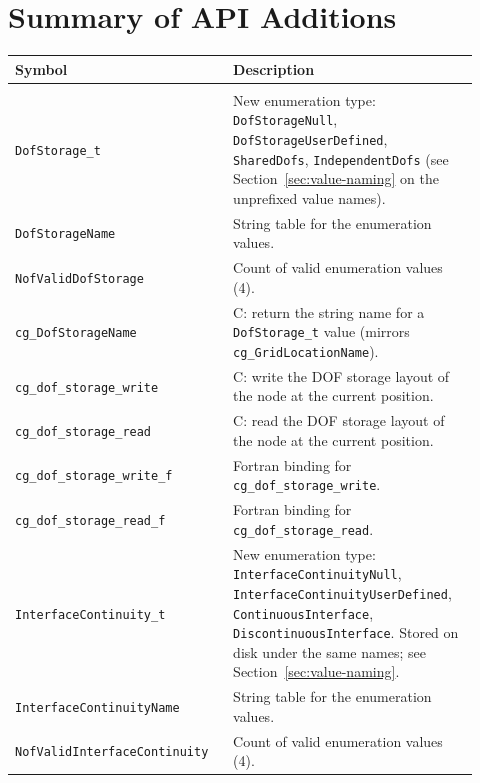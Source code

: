 \documentclass[11pt,letterpaper]{article}
\begin{document}
\section{Summary of API Additions}

\begin{center}
\begin{longtable}{>{\raggedright\arraybackslash}p{0.42\linewidth} >{\raggedright\arraybackslash}p{0.50\linewidth}}
\toprule
\textbf{Symbol} & \textbf{Description} \\
\midrule
\endhead
\multicolumn{2}{@{}l}{\textit{Public (\texttt{cgnslib.h})}} \\
\texttt{DofStorage\_t} & New enumeration type: \texttt{DofStorageNull}, \texttt{DofStorageUserDefined}, \texttt{SharedDofs}, \texttt{IndependentDofs} (see Section~\ref{sec:value-naming} on the unprefixed value names). \\
\texttt{DofStorageName} & String table for the enumeration values. \\
\texttt{NofValidDofStorage} & Count of valid enumeration values (4). \\
\texttt{cg\_DofStorageName} & C: return the string name for a \texttt{DofStorage\_t} value (mirrors \texttt{cg\_GridLocationName}). \\
\texttt{cg\_dof\_storage\_write} & C: write the DOF storage layout of the node at the current position. \\
\texttt{cg\_dof\_storage\_read} & C: read the DOF storage layout of the node at the current position. \\
\texttt{cg\_dof\_storage\_write\_f} & Fortran binding for \texttt{cg\_dof\_storage\_write}. \\
\texttt{cg\_dof\_storage\_read\_f} & Fortran binding for \texttt{cg\_dof\_storage\_read}. \\
\addlinespace
\texttt{InterfaceContinuity\_t} & New enumeration type: \texttt{InterfaceContinuityNull}, \texttt{InterfaceContinuityUserDefined}, \texttt{ContinuousInterface}, \texttt{DiscontinuousInterface}.  Stored on disk under the same names; see Section~\ref{sec:value-naming}. \\
\texttt{InterfaceContinuityName} & String table for the enumeration values. \\
\texttt{NofValidInterface\allowbreak Continuity} & Count of valid enumeration values (4). \\

\end{longtable}
\end{center}
\end{document}
